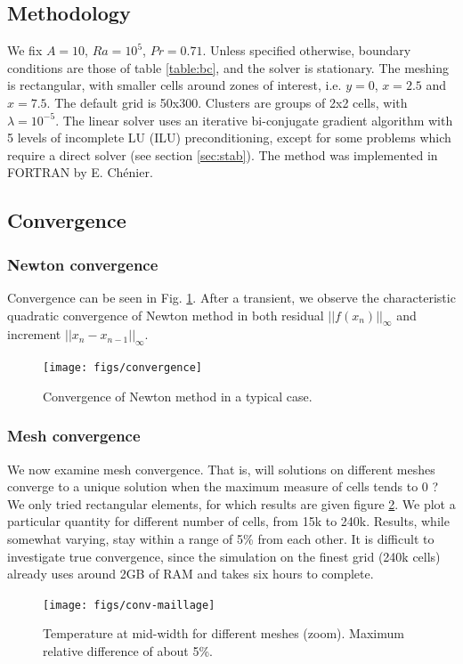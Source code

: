 \documentclass[12pt]{article}
\begin{document}
\subsection{Methodology}
We fix $A = 10$, $Ra = 10^{5}$, $Pr = 0.71$. Unless specified
otherwise, boundary conditions are those of table \ref{table:bc}, and
the solver is stationary. The meshing is rectangular, with smaller
cells around zones of interest, i.e. $y = 0$, $x = 2.5$ and $x =
7.5$. The default grid is 50x300. Clusters are groups of 2x2 cells,
with $\lambda = 10^{-5}$. The linear solver uses an iterative
bi-conjugate gradient algorithm with 5 levels of incomplete LU (ILU)
preconditioning, except for some problems which require a direct
solver (see section \ref{sec:stab}). The method was implemented in
FORTRAN by E. Ch\'enier.
\subsection{Convergence}
\subsubsection{Newton convergence}
\label{sec:conv_newton}
Convergence can be seen in Fig. \ref{fig:conv_newton}. After a
transient, we observe the characteristic quadratic convergence of
Newton method in both residual $||f(x_n)||_\infty$ and increment $||x_{n} -
x_{n-1}||_\infty$.
\begin{figure}[h!]
\centering
\texttt{[image: figs/convergence]}
\caption{Convergence of Newton method in a typical case.}
\label{fig:conv_newton}
\end{figure}

\subsubsection{Mesh convergence}
We now examine mesh convergence. That is, will solutions on different
meshes converge to a unique solution when the maximum measure of cells
tends to 0 ? We only tried rectangular elements, for which results are
given figure \ref{fig:conv-maillage}. We plot a particular quantity
for different number of cells, from 15k to 240k. Results, while
somewhat varying, stay within a range of 5\% from each other. It is
difficult to investigate true convergence, since the simulation on the
finest grid (240k cells) already uses around 2GB of RAM and takes six
hours to complete.

\begin{figure}[h!]
\centering
\texttt{[image: figs/conv-maillage]}
\caption{Temperature at mid-width for different meshes (zoom). Maximum
  relative difference of about 5\%.}
\label{fig:conv-maillage}
\end{figure}
\end{document}
